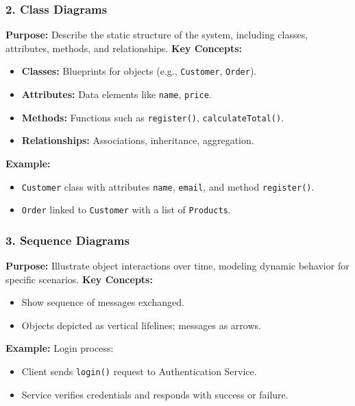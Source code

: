 \documentclass{beamer}
\begin{document}
\begin{frame}[fragile]
    \frametitle{2. Class Diagrams}
    \textbf{Purpose:} Describe the static structure of the system, including classes, attributes, methods, and relationships.
    \textbf{Key Concepts:}
    \begin{itemize}
        \item \textbf{Classes:} Blueprints for objects (e.g., \texttt{Customer}, \texttt{Order}).
        \item \textbf{Attributes:} Data elements like \texttt{name}, \texttt{price}.
        \item \textbf{Methods:} Functions such as \texttt{register()}, \texttt{calculateTotal()}.
        \item \textbf{Relationships:} Associations, inheritance, aggregation.
    \end{itemize}
    \textbf{Example:} 
    \begin{itemize}
        \item \texttt{Customer} class with attributes \texttt{name}, \texttt{email}, and method \texttt{register()}.
        \item \texttt{Order} linked to \texttt{Customer} with a list of \texttt{Products}.
    \end{itemize}
\end{frame}

\begin{frame}[fragile]
    \frametitle{3. Sequence Diagrams}
    \textbf{Purpose:} Illustrate object interactions over time, modeling dynamic behavior for specific scenarios.
    \textbf{Key Concepts:}
    \begin{itemize}
        \item Show sequence of messages exchanged.
        \item Objects depicted as vertical lifelines; messages as arrows.
    \end{itemize}
    \textbf{Example:} Login process:
    \begin{itemize}
        \item Client sends \texttt{login()} request to Authentication Service.
        \item Service verifies credentials and responds with success or failure.
    \end{itemize}
\end{frame}
\end{document}

